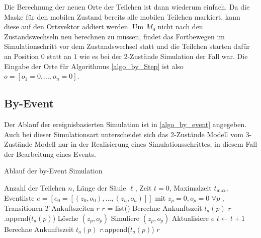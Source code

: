 Die Berechnung der neuen Orte der Teilchen ist dann wiederum einfach. Da die Maske für den mobilen Zustand bereits alle mobilen Teilchen markiert, kann diese auf den Ortsvektor addiert werden. Um $M_0$ nicht nach den Zustandswechseln neu berechnen zu müssen, findet das Fortbewegen im Simulationschritt vor dem Zustandswechsel statt und die Teilchen starten dafür an Position $0$ statt an $1$ wie es bei der 2-Zustände Simulation der Fall war. Die Eingabe der Orte für Algorithmus \ref{algo_by_Step} ist also $o= [o_1 = 0, \ldots, o_n=0]$.




\subsection{By-Event}
Der Ablauf der ereignisbasierten Simulation ist in \ref{algo_by_event} angegeben. Auch bei dieser Simulationsart unterscheidet sich das 2-Zustände Modell vom 3-Zustände Modell nur in der Realisierung eines Simulationsschrittes, in diesem Fall der Bearbeitung eines Events.

\begin{algorithm}
\caption{Ablauf der by-Event Simulation}
\label{algo_by_event}
\begin{algorithmic}[1]
\REQUIRE Anzahl der Teilchen $n$, Länge der Säule $\ell$, Zeit $t=0$, Maximalzeit $t_{\text{max}}$, Eventliste $e= [e_0 = [(z_0, o_0), \ldots, (z_n, o_n)]]$ mit $z_p = 0, o_p = 0$ $\forall p$ , Transitionen $T$
\ENSURE Ankuftszeiten $r$
\STATE $r$ = list()
\STATE Berechne Ankunftszeit $t_a(p)$ 
\STATE $r$.append($t_a(p)$)
\STATE Lösche $(z_p, o_p)$
\ELSE
\STATE Simuliere $(z_p, o_p)$
\STATE Aktualisiere $e$
\ENDIF
\ENDFOR
\STATE $t \leftarrow t+1$
\ENDWHILE
{}
\STATE Berechne Ankunftszeit $t_a(p)$ 
\STATE $r$.append($t_a(p)$)
\ENDIF
\ENDFOR
\ENDFOR
\ENDIF
\RETURN $r$
\end{algorithmic}
\end{algorithm}


